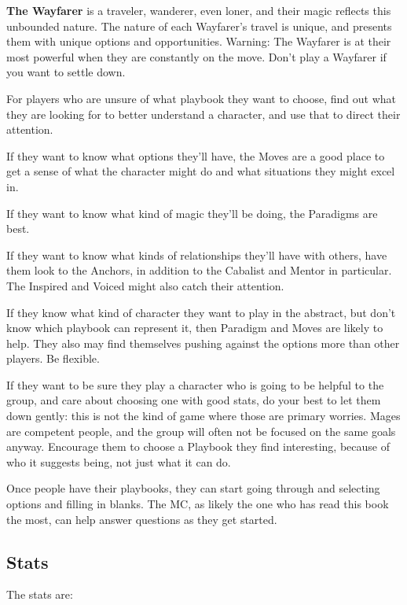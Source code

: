 \documentclass[
]{memoir}
\begin{document}
\textbf{The Wayfarer} is a traveler, wanderer, even loner, and their
magic reflects this unbounded nature. The nature of each Wayfarer's
travel is unique, and presents them with unique options and
opportunities. Warning: The Wayfarer is at their most powerful when they
are constantly on the move. Don't play a Wayfarer if you want to settle
down.

For players who are unsure of what playbook they want to choose, find
out what they are looking for to better understand a character, and use
that to direct their attention.

If they want to know what options they'll have, the Moves are a good
place to get a sense of what the character might do and what situations
they might excel in.

If they want to know what kind of magic they'll be doing, the Paradigms
are best.

If they want to know what kinds of relationships they'll have with
others, have them look to the Anchors, in addition to the Cabalist and
Mentor in particular. The Inspired and Voiced might also catch their
attention.

If they know what kind of character they want to play in the abstract,
but don't know which playbook can represent it, then Paradigm and Moves
are likely to help. They also may find themselves pushing against the
options more than other players. Be flexible.

If they want to be sure they play a character who is going to be helpful
to the group, and care about choosing one with good stats, do your best
to let them down gently: this is not the kind of game where those are
primary worries. Mages are competent people, and the group will often
not be focused on the same goals anyway. Encourage them to choose a
Playbook they find interesting, because of who it suggests being, not
just what it can do.

Once people have their playbooks, they can start going through and
selecting options and filling in blanks. The MC, as likely the one who
has read this book the most, can help answer questions as they get
started.

\hypertarget{stats-10}{%
\subsection{Stats}\label{stats-10}}

The stats are:
\end{document}
